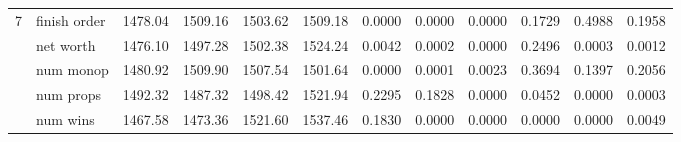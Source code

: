 \begin{landscape}
\begin{table}[ht]
\begin{tabularx}{\linewidth}{|p{1in}|p{1in}|r|r|r|r|r|r|r|r|r|r|}
      \cline{1-12}
      \multirow{5}{*}{7} & finish order & 1478.04 & 1509.16 & 1503.62 & 1509.18 & 0.0000 & 0.0000 & 0.0000 & 0.1729 & 0.4988 & 0.1958 \\
\cline{2-12}             & net worth & 1476.10 & 1497.28 & 1502.38 & 1524.24 & 0.0042 & 0.0002 & 0.0000 & 0.2496 & 0.0003 & 0.0012 \\
\cline{2-12}             & num monop & 1480.92 & 1509.90 & 1507.54 & 1501.64 & 0.0000 & 0.0001 & 0.0023 & 0.3694 & 0.1397 & 0.2056 \\
\cline{2-12}             & num props & 1492.32 & 1487.32 & 1498.42 & 1521.94 & 0.2295 & 0.1828 & 0.0000 & 0.0452 & 0.0000 & 0.0003 \\
\cline{2-12}             & num wins & 1467.58 & 1473.36 & 1521.60 & 1537.46 & 0.1830 & 0.0000 & 0.0000 & 0.0000 & 0.0000 & 0.0049 \\

      \cline{1-12}
    \end{tabularx}%
  \label{tab:addlabel}%
\end{table}%

\end{landscape}